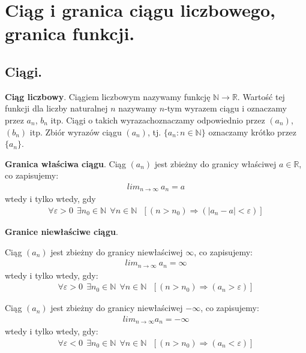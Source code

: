 \documentclass[12pt]{article}
\begin{document}
    \newpage

    \section{Ciąg i granica ciągu liczbowego, granica funkcji.}

    \subsection{Ciągi.}

    \begin{definition}
        \textbf{Ciąg liczbowy}. Ciągiem liczbowym nazywamy funkcję $\mathbb{N} \rightarrow \mathbb{R}$. Wartość tej
        funkcji dla liczby naturalnej $n$ nazywamy $n$-tym wyrazem ciągu i oznaczamy przez $a_n$, $b_n$ itp. Ciągi o
        takich wyrazachoznaczamy odpowiednio przez $(a_n)$, $(b_n)$  itp. Zbiór wyrazów ciągu $(a_n)$, tj.
        $\{a_n : n  \in \mathbb{N}\}$ oznaczamy krótko przez  $\{a_n\}$.
    \end{definition}

    \begin{definition}
        \textbf{Granica właściwa ciągu}. Ciąg $(a_n)$ jest zbieżny do granicy właściwej $a \in \mathbb{R}$, co zapisujemy:
        \begin{align*}
            lim_{n  \rightarrow \infty} ~ a_n = a
        \end{align*}
        wtedy i tylko wtedy, gdy
        \begin{align*}
            \forall \varepsilon > 0 ~~ \exists  n_0 \in \mathbb{N} ~~ \forall n \in \mathbb{N} ~~~ [(n > n_0) \Rightarrow (|a_n - a| < \varepsilon)]
        \end{align*}
    \end{definition}

    \begin{definition}
        \textbf{Granice niewłaściwe ciągu}.

        Ciąg $(a_n)$ jest zbieżny do granicy niewłaściwej $\infty$, co zapisujemy:
        \begin{align*}
            lim_{n \rightarrow \infty} ~ a_n = \infty
        \end{align*}
        wtedy i tylko wtedy, gdy:
        \begin{align*}
            \forall \varepsilon > 0 ~~ \exists  n_0 \in \mathbb{N} ~~ \forall n \in \mathbb{N} ~~~ [(n > n_0) \Rightarrow (a_n > \varepsilon)]
        \end{align*}

        Ciąg $(a_n)$ jest zbieżny do granicy niewłaściwej $-\infty$, co zapisujemy:
        \begin{align*}
            lim_{n \rightarrow \infty} a_n = -\infty
        \end{align*}
        wtedy i tylko wtedy, gdy:
        \begin{align*}
            \forall \varepsilon < 0 ~~ \exists  n_0 \in \mathbb{N} ~~ \forall n \in \mathbb{N} ~~~ [(n > n_0) \Rightarrow (a_n < \varepsilon)]
        \end{align*}
    \end{definition}
\end{document}
